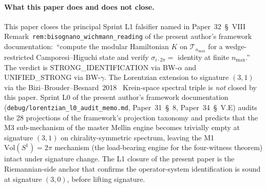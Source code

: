 \documentclass[11pt,a4paper]{article}
\theoremstyle{plain}
\theoremstyle{definition}
\newcommand{\nmax}{n_{\max}}
\newcommand{\Tcal}{\mathcal{T}}
\newcommand{\Vol}{\mathrm{Vol}}
\begin{document}
\paragraph{What this paper does and does not close.}
This paper closes the principal Sprint L1 falsifier named in
Paper~32~\S~VIII Remark~\texttt{rem:bisognano\_wichmann\_reading} of
the present author's framework documentation:\
``compute the modular Hamiltonian $K$ on $\Tcal_{\nmax}$ for a
wedge-restricted Camporesi--Higuchi state and verify $\sigma_{i \cdot 2\pi}
= $ identity at finite $\nmax$.'' The verdict is
STRONG\_IDENTIFICATION via BW-$\alpha$ and UNIFIED\_STRONG via
BW-$\gamma$. The Lorentzian extension to signature $(3, 1)$ via the
Bizi--Brouder--Besnard~2018~\cite{bizi_brouder_besnard2018} Krein-space
spectral triple is \emph{not} closed by this paper. Sprint L0 of
the present author's framework documentation
(\texttt{debug/lorentzian\_l0\_audit\_memo.md},
Paper~31~\S~8, Paper~34~\S~V.E) audits the 28 projections of the
framework's projection taxonomy and predicts that the M3
sub-mechanism of the master Mellin engine becomes trivially empty at
signature $(3, 1)$ on chirality-symmetric spectrum, leaving the M1
$\Vol(S^1) = 2\pi$ mechanism (the load-bearing engine for the
four-witness theorem) intact under signature change. The L1 closure
of the present paper is the Riemannian-side anchor that confirms the
operator-system identification is sound at signature $(3, 0)$, before
lifting signature.
\end{document}
